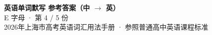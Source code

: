 \documentclass[10pt,a4paper]{article}
\begin{document}
\pagestyle{plain}

\begin{center}
{\LARGE\bfseries 英语单词默写 \quad 参考答案（中 $\to$ 英）}\\[0.22em]
{\large E 字母 · 第 4 / 5 份}\\[0.18em]
{\small 2026年上海市高考英语词汇用法手册 · 参照普通高中英语课程标准}
\end{center}

\vspace{0.2em}
\noindent{\color{rulegray}\rule{\textwidth}{0.8pt}}

\vspace{0.35em}

\vspace{0.25em}
\renewcommand{\arraystretch}{1.32}
\end{document}
